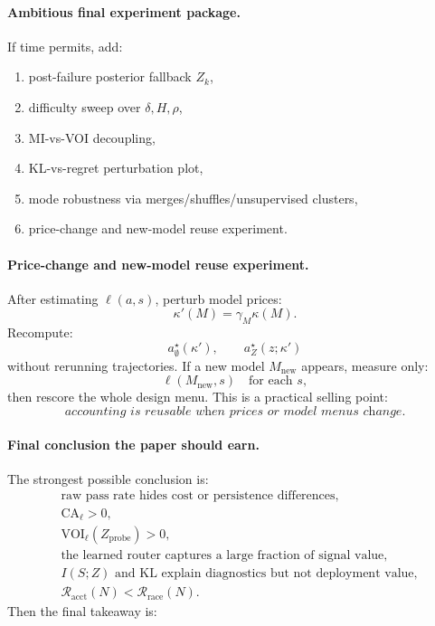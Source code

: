 \documentclass{article}
\begin{document}
\paragraph{Ambitious final experiment package.}
If time permits, add:
\begin{enumerate}[leftmargin=1.25em,itemsep=0.15em]
    \item post-failure posterior fallback \(Z_k\),
    \item difficulty sweep over \(\delta,H,\rho\),
    \item MI-vs-VOI decoupling,
    \item KL-vs-regret perturbation plot,
    \item mode robustness via merges/shuffles/unsupervised clusters,
    \item price-change and new-model reuse experiment.
\end{enumerate}

\paragraph{Price-change and new-model reuse experiment.}
After estimating \(\ell(a,s)\), perturb model prices:
\[
    \kappa'(M)=\gamma_M\kappa(M).
\]
Recompute:
\[
    a^\star_{\emptyset}(\kappa'),
    \qquad
    a^\star_Z(z;\kappa')
\]
without rerunning trajectories.
If a new model \(M_{\mathrm{new}}\) appears, measure only:
\[
    \ell(M_{\mathrm{new}},s)
    \quad\text{for each }s,
\]
then rescore the whole design menu.
This is a practical selling point:
\[
    \textit{accounting is reusable when prices or model menus change.}
\]

\paragraph{Final conclusion the paper should earn.}
The strongest possible conclusion is:
\[
\begin{aligned}
    &\text{raw pass rate hides cost or persistence differences},\\
    &\mathrm{CA}_\ell>0,\\
    &\mathrm{VOI}_\ell(Z_{\mathrm{probe}})>0,\\
    &\text{the learned router captures a large fraction of signal value},\\
    &I(S;Z)\text{ and KL explain diagnostics but not deployment value},\\
    &\mathcal R_{\mathrm{acct}}(N)<\mathcal R_{\mathrm{race}}(N).
\end{aligned}
\]
Then the final takeaway is:
\begin{center}
\setlength{\fboxsep}{7pt}
\end{center}
\end{document}

